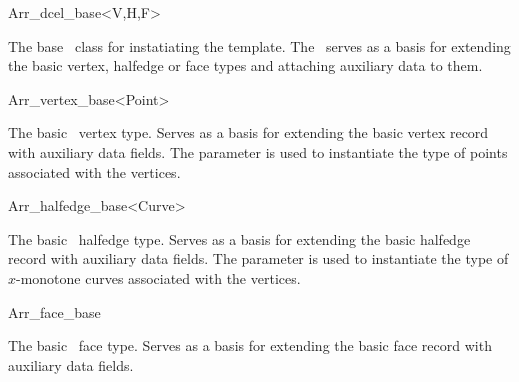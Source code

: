 
\ccRefPageBegin

\begin{ccRefClass}{Arr_dcel_base<V,H,F>}
\label{arr_ref:arr_dcel_base}
    
\ccDefinition

The base \dcel\ class for instatiating the  template.
The \ccClassTemplateName\ serves as a basis for extending the basic vertex,
halfedge or face types and attaching auxiliary data to them.

 
\ccIsModel

\end{ccRefClass}


\begin{ccRefClass}{Arr_vertex_base<Point>}
\label{arr_ref:arr_vertex_base}

\ccDefinition

The basic \dcel\ vertex type. Serves as a basis for extending the basic
vertex record with auxiliary data fields. The  parameter is used
to instantiate the type of points associated with the vertices.

\ccIsModel

\end{ccRefClass}


\begin{ccRefClass}{Arr_halfedge_base<Curve>}
\label{arr_ref:arr_halfedge_base}

\ccDefinition

The basic \dcel\ halfedge type. Serves as a basis for extending the basic
halfedge record with auxiliary data fields. The  parameter is used
to instantiate the type of $x$-monotone curves associated with the vertices.

\ccIsModel

\end{ccRefClass}


\begin{ccRefClass}{Arr_face_base}
\label{arr_ref:arr_face_base}

\ccDefinition

The basic \dcel\ face type. Serves as a basis for extending the basic
face record with auxiliary data fields.

\ccIsModel

\end{ccRefClass}

\ccRefPageEnd
